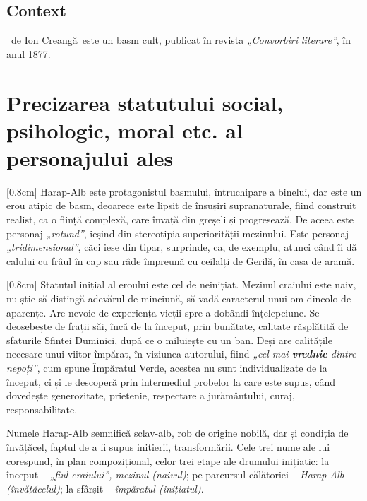 \renewcommand{\operatitle}{\textbfit{„Povestea lui Harap-Alb”}} %
\renewcommand{\operaauthor}{Ion Creangă} %


\subsection{Context}

\operatitle\ de \operaauthor\ este un basm cult, publicat în revista \textit{„Convorbiri literare”}, în anul 1877.


\section{Precizarea statutului social, psihologic, moral etc. al personajului ales}

[0.8cm]
Harap-Alb este protagonistul basmului, întruchipare a binelui, dar este un erou atipic de basm, deoarece este lipsit de însușiri supranaturale, fiind construit realist, ca o ființă complexă, care învață din greșeli și progresează. De aceea este personaj \textit{„rotund”}, ieșind din stereotipia superiorității mezinului. Este personaj \textit{„tridimensional”}, căci iese din tipar, surprinde, ca, de exemplu, atunci când îi dă calului cu frâul în cap sau râde împreună cu ceilalți de Gerilă, în casa de aramă.

[0.8cm]
Statutul inițial al eroului este cel de neinițiat. Mezinul craiului este naiv, nu știe să distingă adevărul de minciună, să vadă caracterul unui om dincolo de aparențe. Are nevoie de experiența vieții spre a dobândi înțelepciune. Se deosebește de frații săi, încă de la început, prin bunătate, calitate răsplătită de sfaturile Sfintei Duminici, după ce o miluiește cu un ban. Deși are calitățile necesare unui viitor împărat, în viziunea autorului, fiind \textit{„cel mai \textbf{vrednic} dintre nepoți”}, cum spune Împăratul Verde, acestea nu sunt individualizate de la început, ci și le descoperă prin intermediul probelor la care este supus, când dovedește generozitate, prietenie, respectare a jurământului, curaj, responsabilitate.

Numele Harap-Alb semnifică sclav-alb, rob de origine nobilă, dar și condiția de învățăcel, faptul de a fi supus inițierii, transformării. Cele trei nume ale lui corespund, în plan compozițional, celor trei etape ale drumului inițiatic: la început -- \textit{„fiul craiului”, mezinul (naivul)}; pe parcursul călătoriei -- \textit{Harap-Alb (învățăcelul)}; la sfârșit -- \textit{împăratul (inițiatul)}.



